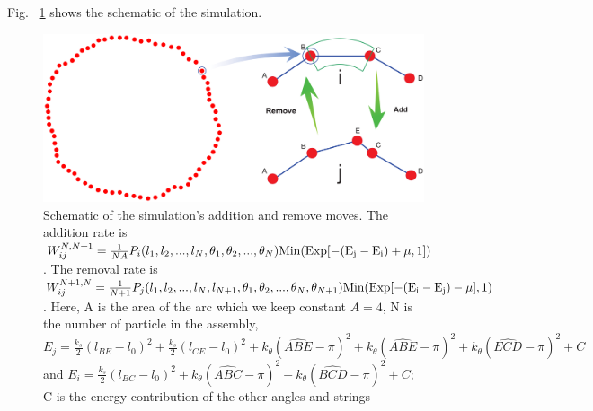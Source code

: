 \documentclass[amsmath,preprintnumbers,10pt,nofootinbib,prl,twocolumn]{revtex4-1}
\begin{document}
Fig. ~\ref{fig:SimulationSchematic} shows the schematic of the simulation.
\begin{figure}[t]
\includegraphics[width=1\linewidth,angle=0]{AddingMoveSchematic.pdf}
\caption{ Schematic of the simulation's addition and remove moves. The addition rate is $W_{ij}^{N,N+1}=\frac{1}{NA} P_i(l_1,l_2,...,l_N,\theta_1,\theta_2,...,\theta_N)\rm{Min}(\rm{Exp}[-(E_j-E_i) +\mu,1])$. The removal rate is $W_{ij}^{N+1,N}=\frac{1}{N+1}P_j(l_1,l_2,...,l_N,l_{N+1},\theta_1,\theta_2,...,\theta_N,\theta_{N+1})\rm{Min}(\rm{Exp}[-(E_i-E_j) -\mu],1)$. Here, A is the area of the arc which we keep constant $A=4$, N is the number of particle in the assembly, $E_j = \frac{k_s}{2}(l_{BE}-l_0)^2+\frac{k_s}{2}(l_{CE}-l_0)^2+k_\theta(\widehat{ABE}-\pi)^2+k_\theta(\widehat{ABE}-\pi)^2+k_\theta(\widehat{ECD}-\pi)^2+C$ and $E_i=\frac{k_s}{2}(l_{BC}-l_0)^2+k_\theta(\widehat{ABC}-\pi)^2+k_\theta(\widehat{BCD}-\pi)^2+C$; C is the energy contribution of the other angles and strings }
\label{fig:SimulationSchematic}
\end{figure}
\end{document}
